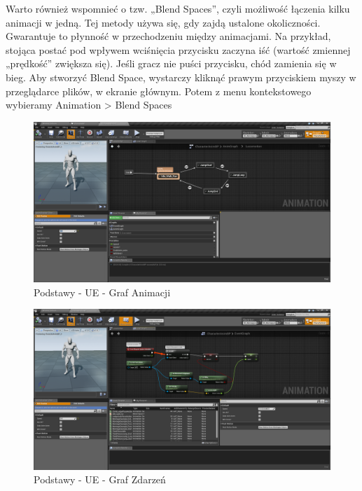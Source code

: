 \documentclass[12pt]{xmgr}
\begin{document}
Warto również wspomnieć o tzw. „Blend Spaces”, czyli możliwość łączenia kilku animacji w jedną. Tej metody używa się, gdy zajdą ustalone okoliczności. Gwarantuje to płynność w przechodzeniu między animacjami. Na przykład, stojąca postać pod wpływem wciśnięcia przycisku zaczyna iść (wartość zmiennej „prędkość” zwiększa się). Jeśli gracz nie puści przycisku, chód zamienia się w bieg.
Aby stworzyć Blend Space, wystarczy kliknąć prawym przyciskiem myszy w przeglądarce plików, w ekranie głównym. Potem z menu kontekstowego wybieramy Animation > Blend Spaces

\newpage
\begin{figure}[!htb]
    \begin{center}
    \includegraphics[scale=0.2]{Screeny/AnimGraph_Event}
    \end{center}
    \caption{Podstawy - UE - Graf Animacji}
\end{figure}

\begin{figure}[!htb]
    \begin{center}
    \includegraphics[scale=0.2]{Screeny/EventGraph_Event}
    \end{center}
    \caption{Podstawy - UE - Graf Zdarzeń}
\end{figure}
\end{document}
